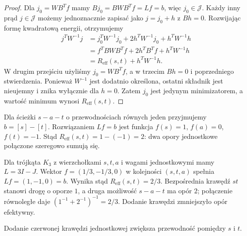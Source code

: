 \begin{proof}
Dla $j_0=WB^Tf$ mamy
$Bj_0=BWB^Tf=Lf=b$, więc $j_0\in\mathcal J$.
Każdy inny prąd $j\in\mathcal J$ możemy jednoznacznie
zapisać jako $j=j_0+h$ z $Bh=0$.
Rozwijając formę kwadratową energii,
otrzymujemy
\[
\begin{aligned}
 j^TW^{-1}j
 &=j_0^TW^{-1}j_0+2h^TW^{-1}j_0+h^TW^{-1}h\\
 &=f^TBWB^Tf+2h^TB^Tf+h^TW^{-1}h\\
 &=R_{\mathrm{eff}}(s,t)+h^TW^{-1}h.
\end{aligned}
\]
W drugim przejściu użyliśmy $j_0=WB^Tf$,
a w trzecim $Bh=0$ i poprzedniego stwierdzenia.
Ponieważ $W^{-1}$ jest dodatnio określona,
ostatni składnik jest nieujemny i znika wyłącznie
dla $h=0$. Zatem $j_0$ jest jedynym minimizatorem,
a wartość minimum wynosi $R_{\mathrm{eff}}(s,t)$.
\end{proof}

\begin{przyklad}
Dla ścieżki $s-a-t$ o przewodnościach równych jeden
przyjmujemy $b=[s]-[t]$. Rozwiązaniem $Lf=b$
jest funkcja $f(s)=1$, $f(a)=0$, $f(t)=-1$.
Stąd $R_{\mathrm{eff}}(s,t)=1-(-1)=2$:
dwa opory jednostkowe połączone szeregowo sumują się.

Dla trójkąta $K_3$ z wierzchołkami $s,t,a$
i wagami jednostkowymi mamy $L=3I-J$.
Wektor $f=(1/3,-1/3,0)$ w kolejności $(s,t,a)$
spełnia $Lf=(1,-1,0)=b$.
Wynika stąd
$R_{\mathrm{eff}}(s,t)=2/3$.
Bezpośrednia krawędź $st$ stanowi drogę o oporze $1$,
a druga możliwość $s-a-t$ ma opór $2$;
połączenie równoległe daje $(1^{-1}+2^{-1})^{-1}=2/3$.
Dodanie krawędzi zmniejszyło opór efektywny.
\end{przyklad}

\begin{center}

{\footnotesize Dodanie czerwonej krawędzi jednostkowej
zwiększa przewodność pomiędzy $s$ i $t$.}
\end{center}


